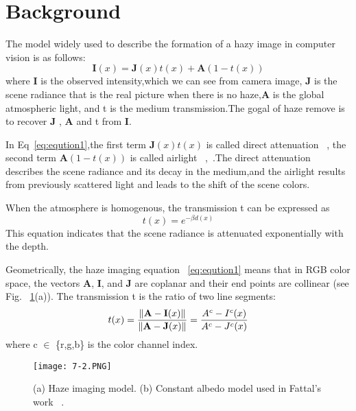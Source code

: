 \documentclass[10pt,twocolumn,letterpaper]{article}
\begin{document}
\section{Background}	
	The model widely used to describe the formation of a hazy image in computer vision is as follows:
\begin{equation}
\textbf{I}(x) = \textbf{J}(x)t(x)+\textbf{A}(1-t(x)) \label{eq:eqution1}
\end{equation}
where \textbf{I} is the observed intensity,which we can see from camera image,  \textbf{J} is the scene radiance that is the real picture when there is no haze,\textbf{A} is the global atmospheric light, and t is the medium transmission.The gogal of haze remove is to recover \textbf{J} , \textbf{A} and t from \textbf{I}.\par 
In Eq~\ref{eq:eqution1},the first term $\textbf{J}(x)t(x)$ is called direct attenuation ~\cite{Visibility2008_5}, the second term $\textbf{A}(1-t(x))$ is called airlight ~\cite{Theorie1924_1},~\cite{Visibility2008_5}.The direct attenuation describes the scene radiance and its decay in the medium,and the airlight results from previously scattered light and leads to the shift of the scene colors.\par
When the atmosphere is homogenous, the transmission t can be expressed as
\begin{equation}
t(x) = e^{-\beta d(x)}
\end{equation}
This equation indicates that the scene radiance is attenuated exponentially with the depth.\par
Geometrically, the haze imaging equation ~\ref{eq:eqution1} means that in RGB color space, the vectors \textbf{A}, \textbf{I}, and \textbf{J} are coplanar and their end points are collinear (see Fig. ~\ref{fig:secondpicture}(a)). The transmission t is the ratio of two line segments:
\begin{equation}
t(x) = \frac{\Arrowvert \textbf{A} - \textbf{I}(x) \Arrowvert}{\Arrowvert
 \textbf{A} - \textbf{J}(x) \Arrowvert} = \frac{A^{c}-I^{c}(x)}{A^{c} - J^{c}(x)}
\end{equation}
where c $\in$ \{r,g,b\} is the color channel index.
\begin{figure}[htb]
\centering
\texttt{[image: 7-2.PNG]}
\caption{(a) Haze imaging model. (b) Constant albedo model used in
Fattal’s work ~\cite{Single2008_4}.}
\label{fig:secondpicture}
\end{figure}


{\small


}
\end{document}
